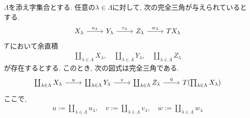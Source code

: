 \documentclass[uplatex, a4paper, 14Q, dvipdfmx]{jsarticle}
\begin{document}
\begin{corollary} \label{preserve_coprod}
  $\Lambda$を添え字集合とする. 
  任意の$\lambda \in \Lambda$に対して, 次の完全三角が与えられているとする. 
  \[\begin{tikzcd}
    {X_\lambda} & {Y_\lambda} & {Z_\lambda} & {TX_\lambda}
    \arrow["{u_\lambda}", from=1-1, to=1-2]
    \arrow["{v_\lambda}", from=1-2, to=1-3]
    \arrow["{w_\lambda}", from=1-3, to=1-4]
  \end{tikzcd}\]
  $\mathcal{T}$において余直積
  \begin{align*}
    \coprod_{\lambda \in \Lambda} X_\lambda, \quad
    \coprod_{\lambda \in \Lambda} Y_\lambda, \quad
    \coprod_{\lambda \in \Lambda} Z_\lambda
  \end{align*}
  が存在するとする. 
  このとき, 次の図式は完全三角である. 
  \[\begin{tikzcd}
    {\coprod_{\lambda \in \Lambda} X_\lambda} & {\coprod_{\lambda \in \Lambda} Y_\lambda} & {\coprod_{\lambda \in \Lambda} Z_\lambda} & {T(\prod_{\lambda \in \Lambda} X_\lambda)}
    \arrow["{u}", from=1-1, to=1-2]
    \arrow["{v}", from=1-2, to=1-3]
    \arrow["{q}", from=1-3, to=1-4]
  \end{tikzcd}\]
  ここで, 
  \begin{align*}
    u:= \coprod_{\lambda \in \Lambda} u_\lambda, \quad
    v:= \coprod_{\lambda \in \Lambda} v_\lambda, \quad
    w:= \coprod_{\lambda \in \Lambda} w_\lambda
  \end{align*}
\end{corollary}

\end{document}
